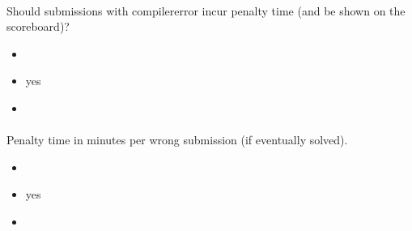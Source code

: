 \documentclass[a4paper,10pt,english,openany]{sphinxmanual}
\begin{document}
\paragraph{}
\label{\detokenize{configuration-reference:compile-penalty}}
\sphinxAtStartPar
Should submissions with compiler\sphinxhyphen{}error incur penalty time (and be shown on the scoreboard)?
\begin{itemize}
\item {} 
\sphinxAtStartPar
{} 

\item {} 
\sphinxAtStartPar
{} yes

\item {} 
\sphinxAtStartPar
{} 

\end{itemize}


\paragraph{}
\label{\detokenize{configuration-reference:penalty-time}}
\sphinxAtStartPar
Penalty time in minutes per wrong submission (if eventually solved).
\begin{itemize}
\item {} 
\sphinxAtStartPar
{} 

\item {} 
\sphinxAtStartPar
{} yes

\item {} 
\sphinxAtStartPar
{} 

\end{itemize}
\end{document}
